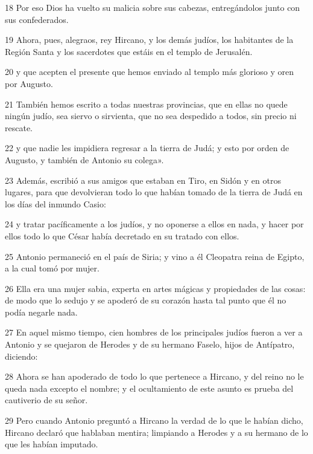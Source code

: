 \par 18 Por eso Dios ha vuelto su malicia sobre sus cabezas, entregándolos junto con sus confederados.

\par 19 Ahora, pues, alegraos, rey Hircano, y los demás judíos, los habitantes de la Región Santa y los sacerdotes que estáis en el templo de Jerusalén.

\par 20 y que acepten el presente que hemos enviado al templo más glorioso y oren por Augusto.

\par 21 También hemos escrito a todas nuestras provincias, que en ellas no quede ningún judío, sea siervo o sirvienta, que no sea despedido a todos, sin precio ni rescate.

\par 22 y que nadie les impidiera regresar a la tierra de Judá; y esto por orden de Augusto, y también de Antonio su colega».

\par 23 Además, escribió a sus amigos que estaban en Tiro, en Sidón y en otros lugares, para que devolvieran todo lo que habían tomado de la tierra de Judá en los días del inmundo Casio:

\par 24 y tratar pacíficamente a los judíos, y no oponerse a ellos en nada, y hacer por ellos todo lo que César había decretado en su tratado con ellos.

\par 25 Antonio permaneció en el país de Siria; y vino a él Cleopatra reina de Egipto, a la cual tomó por mujer.

\par 26 Ella era una mujer sabia, experta en artes mágicas y propiedades de las cosas: de modo que lo sedujo y se apoderó de su corazón hasta tal punto que él no podía negarle nada.

\par 27 En aquel mismo tiempo, cien hombres de los principales judíos fueron a ver a Antonio y se quejaron de Herodes y de su hermano Faselo, hijos de Antípatro, diciendo:

\par 28 Ahora se han apoderado de todo lo que pertenece a Hircano, y del reino no le queda nada excepto el nombre; y el ocultamiento de este asunto es prueba del cautiverio de su señor.

\par 29 Pero cuando Antonio preguntó a Hircano la verdad de lo que le habían dicho, Hircano declaró que hablaban mentira; limpiando a Herodes y a su hermano de lo que les habían imputado.

